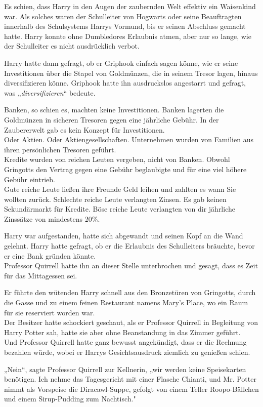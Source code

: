 {Es schien, dass Harry in den Augen der zaubernden Welt effektiv ein Waisenkind war. Als solches waren der Schulleiter von Hogwarts oder seine Beauftragten innerhalb des Schulsystems Harrys Vormund, bis er seinen Abschluss gemacht hatte. Harry konnte ohne Dumbledores Erlaubnis atmen, aber nur so lange, wie der Schulleiter es nicht ausdrücklich verbot.

Harry hatte dann gefragt, ob er Griphook einfach sagen könne, wie er seine Investitionen über die Stapel von Goldmünzen, die in seinem Tresor lagen, hinaus diversifizieren könne. Griphook hatte ihn ausdruckslos angestarrt und gefragt, was „\emph{diversifizieren}“ bedeute.

Banken, so schien es, machten keine Investitionen. Banken lagerten die Goldmünzen in sicheren Tresoren gegen eine jährliche Gebühr. In der Zaubererwelt gab es kein Konzept für Investitionen.\\ Oder Aktien. Oder Aktiengesellschaften. Unternehmen wurden von Familien aus ihren persönlichen Tresoren geführt.\\ Kredite wurden von reichen Leuten vergeben, nicht von Banken. Obwohl Gringotts den Vertrag gegen eine Gebühr beglaubigte und für eine viel höhere Gebühr eintrieb.\\ Gute reiche Leute ließen ihre Freunde Geld leihen und zahlten es wann Sie wollten zurück. Schlechte reiche Leute verlangten Zinsen. Es gab keinen Sekundärmarkt für Kredite. Böse reiche Leute verlangten von dir jährliche Zinssätze von mindestens 20\%.

Harry war aufgestanden, hatte sich abgewandt und seinen Kopf an die Wand gelehnt. Harry hatte gefragt, ob er die Erlaubnis des Schulleiters bräuchte, bevor er eine Bank gründen könnte.\\ Professor Quirrell hatte ihn an dieser Stelle unterbrochen und gesagt, dass es Zeit für das Mittagessen sei.

Er führte den wütenden Harry schnell aus den Bronzetüren von Gringotts, durch die Gasse und zu einem feinen Restaurant namens Mary's Place, wo ein Raum für sie reserviert worden war.\\ Der Besitzer hatte schockiert geschaut, als er Professor Quirrell in Begleitung von Harry Potter sah, hatte sie aber ohne Beanstandung in das Zimmer geführt.\\ Und Professor Quirrell hatte ganz bewusst angekündigt, dass er die Rechnung bezahlen würde, wobei er Harrys Gesichtsausdruck ziemlich zu genießen schien.

„Nein“, sagte Professor Quirrell zur Kellnerin, „wir werden keine Speisekarten benötigen. Ich nehme das Tagesgericht mit einer Flasche Chianti, und Mr. Potter nimmt als Vorspeise die Diracawl-Suppe, gefolgt von einem Teller Roopo-Bällchen und einem Sirup-Pudding zum Nachtisch."

}
